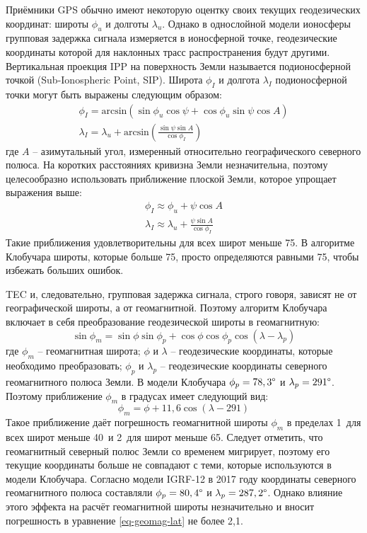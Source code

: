 Приёмники GPS обычно имеют некоторую оцентку своих текущих геодезических координат: широты $\phi_u$ и долготы $\lambda_u$.
Однако в однослойной модели ионосферы групповая задержка сигнала измеряется в ионосферной точке, геодезические координаты которой для наклонных трасс распространения будут другими.
Вертикальная проекция IPP на поверхность Земли называется подионосферной точкой (Sub-Ionospheric Point, SIP).
Широта $\phi_I$ и долгота $\lambda_I$ подионосферной точки могут быть выражены следующим образом:
\begin{equation}
\begin{gathered}
\phi_I=\text{arcsin}(\sin \phi_u\cos \psi+\cos\phi_u\sin\psi\cos A) \\
\lambda_I=\lambda_u+\text{arcsin}\left(\frac{\sin\psi\sin A}{\cos\phi_I}\right)
\end{gathered}    
\end{equation}
где
$A$ -- азимутальный угол, измеренный относительно географического северного полюса.
На коротких расстояниях кривизна Земли незначительна, поэтому целесообразно использовать приближение плоской Земли, которое упрощает выражения выше:
\begin{equation}
\begin{gathered}
\phi_I\approx\phi_u+\psi\cos A \\
\lambda_I\approx\lambda_u+\frac{\psi\sin A}{\cos\phi_I}
\end{gathered}  
\label{eq-lat-lon-sip}  
\end{equation}
Такие приближения удовлетворительны для всех широт меньше 75\degree.
В алгоритме Клобучара широты, которые больше 75\degree, просто определяются равными 75\degree, чтобы избежать больших ошибок.

TEC и, следовательно, групповая задержка сигнала, строго говоря, зависят не от географической широты, а от геомагнитной.
Поэтому алгоритм Клобучара включает в себя преобразование геодезической широты в геомагнитную:
\begin{equation}
\sin\phi_m=\sin\phi\sin\phi_p+\cos\phi\cos\phi_p\cos(\lambda-\lambda_p)
\end{equation}
где
$\phi_m$ -- геомагнитная широта;
$\phi$ и $\lambda$ -- геодезические координаты, которые необходимо преобразовать;
$\phi_p$ и $\lambda_p$ -- геодезические координаты северного геомагнитного полюса Земли.
В модели Клобучара $\phi_p=78,3\degree$ и $\lambda_p=291\degree$.
Поэтому приближение $\phi_m$ в градусах имеет следующий вид:
\begin{equation}
\phi_m=\phi+11,6\cos(\lambda-291)
\label{eq-geomag-lat}
\end{equation}
Такое приближение даёт погрешность геомагнитной широты $\phi_m$ в пределах 1\degree~для всех широт меньше 40\degree~и 2\degree~для широт меньше 65\degree. 
Следует отметить, что геомагнитный северный полюс Земли со временем мигрирует, поэтому его текущие координаты больше не совпадают с теми, которые используются в модели Клобучара. 
Согласно модели IGRF-12 \cite{Thebault2015} в 2017 году координаты северного геомагнитного полюса составляли $\phi_p=80,4\degree$ и $\lambda_p=287,2\degree$.
Однако влияние этого эффекта на расчёт геомагнитной широты незначительно и вносит погрешность в уравнение \eqref{eq-geomag-lat} не более 2,1\degree.

